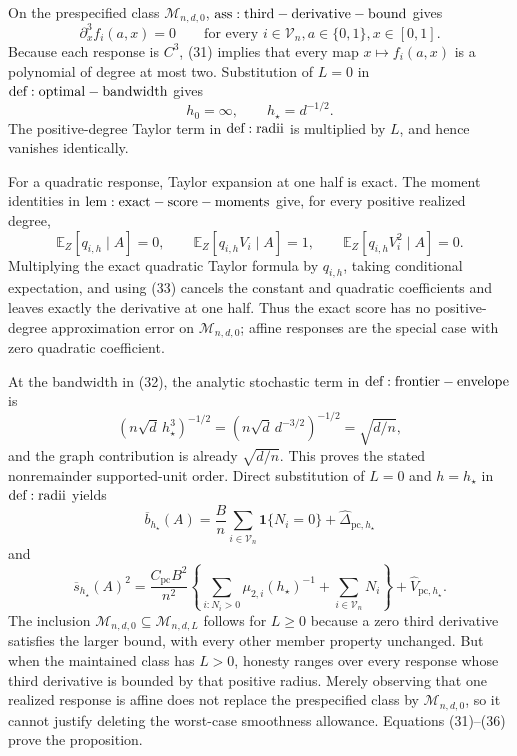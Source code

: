 On the prespecified class \(\mathcal M_{n,d,0}\), \({\rm ass:third-derivative-bound}\) gives
\[
 \partial_x^3f_i(a,x)=0
 \qquad
 \text{for every }i\in\mathcal V_n, a\in\{0,1\}, x\in[0,1].
\tag{31}
\]
Because each response is \(C^3\), (31) implies that every map \(x\mapsto f_i(a,x)\) is a polynomial of degree at most two.  Substitution of \(L=0\) in \({\rm def:optimal-bandwidth}\) gives
\[
 h_0=\infty,
 \qquad
 h_\star=d^{-1/2}.
\tag{32}
\]
The positive-degree Taylor term in \({\rm def:radii}\) is multiplied by \(L\), and hence vanishes identically.

For a quadratic response, Taylor expansion at one half is exact.  The moment identities in \({\rm lem:exact-score-moments}\) give, for every positive realized degree,
\[
 \mathbb E_Z[q_{i,h}\mid A]=0,
 \qquad
 \mathbb E_Z[q_{i,h}V_i\mid A]=1,
 \qquad
 \mathbb E_Z[q_{i,h}V_i^2\mid A]=0.
\tag{33}
\]
Multiplying the exact quadratic Taylor formula by \(q_{i,h}\), taking conditional expectation, and using (33) cancels the constant and quadratic coefficients and leaves exactly the derivative at one half.  Thus the exact score has no positive-degree approximation error on \(\mathcal M_{n,d,0}\); affine responses are the special case with zero quadratic coefficient.

At the bandwidth in (32), the analytic stochastic term in \({\rm def:frontier-envelope}\) is
\[
 (n\sqrt d\,h_\star^3)^{-1/2}
 =(n\sqrt d\,d^{-3/2})^{-1/2}
 =\sqrt{d/n},
\tag{34}
\]
and the graph contribution is already \(\sqrt{d/n}\).  This proves the stated nonremainder supported-unit order.  Direct substitution of \(L=0\) and \(h=h_\star\) in \({\rm def:radii}\) yields
\[
 \overline b_{h_\star}(A)
 =\frac Bn\sum_{i\in\mathcal V_n}\mathbf1\{N_i=0\}
 +\widehat\Delta_{\mathrm{pc},h_\star}
\tag{35}
\]
and
\[
 \overline s_{h_\star}(A)^2
 =\frac{C_{\mathrm{pc}}B^2}{n^2}
 \left\{\sum_{i:N_i>0}\mu_{2,i}(h_\star)^{-1}
       +\sum_{i\in\mathcal V_n}N_i\right\}
 +\widehat V_{\mathrm{pc},h_\star}.
\tag{36}
\]
The inclusion \(\mathcal M_{n,d,0}\subseteq\mathcal M_{n,d,L}\) follows for \(L\geq0\) because a zero third derivative satisfies the larger bound, with every other member property unchanged.  But when the maintained class has \(L>0\), honesty ranges over every response whose third derivative is bounded by that positive radius.  Merely observing that one realized response is affine does not replace the prespecified class by \(\mathcal M_{n,d,0}\), so it cannot justify deleting the worst-case smoothness allowance.  Equations (31)--(36) prove the proposition.